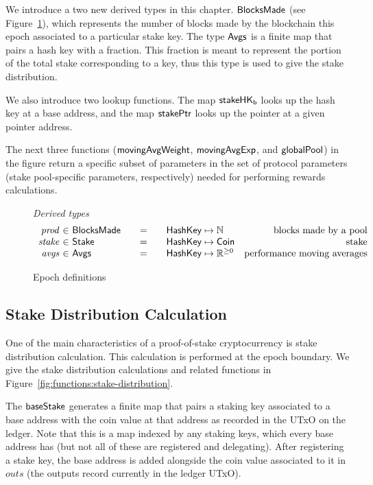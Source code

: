 We introduce a two new derived types in this chapter. $\mathsf{BlocksMade}$ (see
Figure~\ref{fig:epoch-defs}), which represents the number of blocks made by
the blockchain this epoch associated to a particular stake key. The type
$\mathsf{Avgs}$ is a finite map that pairs a hash key with a fraction. This fraction
is meant to represent the portion of the total stake corresponding to a key,
thus this type is used to give the stake distribution.

We also introduce two lookup functions. The map $\mathsf{stakeHK_b}$ looks up the
hash key at a base address, and the map $\mathsf{stakePtr}$ looks up the pointer
at a given pointer address.

The next three functions ($\mathsf{movingAvgWeight}$, $\mathsf{movingAvgExp}$, and
$\mathsf{globalPool}$) in the figure return a specific subset of parameters
in the set of protocol parameters (stake pool-specific parameters, respectively)
needed for performing rewards calculations.

\begin{figure}[htb]
  \emph{Derived types}
  \begin{equation*}
    \begin{array}{r@{~\in~}l@{\qquad=\qquad}lr}
      \var{prod}
      & \BlocksMade
      & \HashKey \mapsto \N
      & \text{blocks made by a pool} \\
      \var{stake}
      & \Stake
      & \HashKey \mapsto \Coin
      & \text{stake} \\
      \var{avgs}
      & \Avgs
      & \HashKey \mapsto \Rnn
      & \text{performance moving averages} \\
    \end{array}
  \end{equation*}
  \caption{Epoch definitions}
  \label{fig:epoch-defs}
\end{figure}

\subsection{Stake Distribution Calculation}
\label{sec:stake-dist}

One of the main characteristics of a proof-of-stake cryptocurrency is stake
distribution calculation. This calculation is performed at the epoch boundary.
We give the stake distribution calculations and related functions in
Figure~\ref{fig:functions:stake-distribution}.

The $\mathsf{baseStake}$ generates a finite map that pairs a staking key
associated to a base address with the coin value at that address as recorded
in the UTxO on the ledger. Note that this is a map indexed by any staking keys,
which every base address has (but not all of these are registered and delegating).
After registering a stake key, the base address is added alongside the
coin value associated to it in $outs$ (the outputs record currently in the
ledger UTxO).

